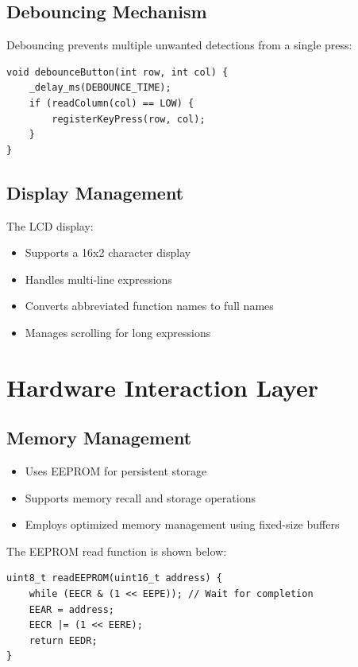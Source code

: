 \documentclass[journal]{IEEEtran}
\numberwithin{equation}{enumi}
\numberwithin{figure}{enumi}
\begin{document}
\subsection{Debouncing Mechanism}

Debouncing prevents multiple unwanted detections from a single press:

\begin{lstlisting}[caption=Debounce Function, label=lst:debounce]
void debounceButton(int row, int col) {
    _delay_ms(DEBOUNCE_TIME);
    if (readColumn(col) == LOW) {
        registerKeyPress(row, col);
    }
}
\end{lstlisting}

\subsection{Display Management}

The LCD display:

\begin{itemize}
    \item Supports a 16x2 character display
    \item Handles multi-line expressions
    \item Converts abbreviated function names to full names
    \item Manages scrolling for long expressions
\end{itemize}

\section{Hardware Interaction Layer}

\subsection{Memory Management}

\begin{itemize}
    \item Uses EEPROM for persistent storage
    \item Supports memory recall and storage operations
    \item Employs optimized memory management using fixed-size buffers
\end{itemize}

The EEPROM read function is shown below:

\begin{lstlisting}[caption=EEPROM Read Function, label=lst:eeprom]
uint8_t readEEPROM(uint16_t address) {
    while (EECR & (1 << EEPE)); // Wait for completion
    EEAR = address;
    EECR |= (1 << EERE);
    return EEDR;
}
\end{lstlisting}
\end{document}
